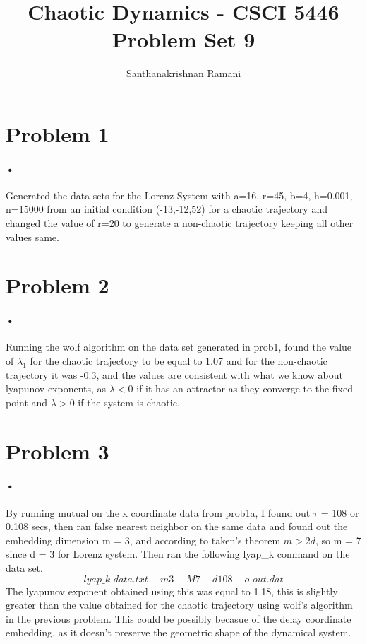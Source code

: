 \documentclass{article}
\title{\textbf{Chaotic Dynamics - CSCI 5446} \\
Problem Set 9}
\author{Santhanakrishnan Ramani}
\begin{document}
\maketitle

\section*{Problem 1}
\paragraph{•}
Generated the data sets for the Lorenz System with a=16, r=45, b=4, h=0.001, n=15000 from an initial condition (-13,-12,52) for a chaotic trajectory and changed the value of r=20 to generate a non-chaotic trajectory keeping all other values same.
 
\section*{Problem 2}
\paragraph{•}
Running the wolf algorithm on the data set generated in prob1, found the value of $\lambda_{1}$ for the chaotic trajectory to be equal to 1.07 and for the non-chaotic trajectory it was -0.3, and the values are consistent with what we know about lyapunov exponents, as $\lambda < 0$ if it has an attractor as they converge to the fixed point and $\lambda > 0$ if the system is chaotic.

\section*{Problem 3}
\paragraph{•}
By running mutual on the x coordinate data from prob1a, I found out $\tau$ = 108 or 0.108 secs, then ran false nearest neighbor on the same data and found out the embedding dimension m = 3, and according to taken's theorem $m > 2d$, so m = 7 since d = 3 for Lorenz system. Then ran the following lyap\_k command on the data set. 
$$lyap\_k\,\, data.txt -m3 -M7 -d108 -o\,\, out.dat$$
The lyapunov exponent obtained using this was equal to 1.18, this is slightly greater than the value obtained for the chaotic trajectory using wolf's algorithm in the previous problem. This could be possibly becasue of the delay coordinate embedding, as it doesn't preserve the geometric shape of the dynamical system.
\end{document}
